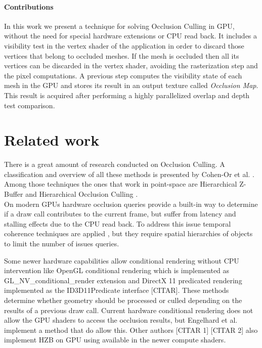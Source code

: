 \documentclass[10pt, conference]{IEEEtran}
\begin{document}
\paragraph*{Contributions}
%
In this work we present a technique for solving Occlusion Culling in GPU, without the need for special hardware extensions or CPU read back. 
It includes a visibility test in the vertex shader of the application in order to discard those vertices that belong to occluded meshes. 
If the mesh is occluded then all its vertices can be discarded in the vertex shader, avoiding the rasterization step and the pixel computations. 
A previous step computes the visibility state of each mesh in the GPU and stores its result in an output texture called \emph{Occlusion Map}. 
This result is acquired after performing a highly parallelized overlap and depth test comparison.


\section{Related work}
%
There is a great amount of research conducted on Occlusion Culling. 
A classification and overview of all these methods is presented by Cohen-Or et al. \cite{survey_visibility}. 
Among those techniques the ones that work in point-space are Hierarchical Z-Buffer \cite{Hierarchical_zbuffer} and Hierarchical Occlusion Culling \cite{hom}.\\

On modern GPUs hardware occlusion queries \cite{nv_occlusion_queries} provide a built-in way to determine if a draw call contributes to the current frame, 
but suffer from latency and stalling effects due to the CPU read back. 
To address this issue temporal coherence techniques are applied \cite{occlusion_queries_2}\cite{occlusion_queries_3}, but they require spatial hierarchies of objects to limit the number 
of issues queries.\

Some newer hardware capabilities allow conditional rendering without CPU intervention like OpenGL conditional rendering  which is implemented as 
GL\_NV\_conditional\_render \cite{nv_conditional_render} extension and DirectX 11 predicated rendering implemented as the ID3D11Predicate interface [CITAR]. 
These methods determine whether geometry should be processed or culled depending on the results of a previous draw call. 
Current hardware conditional rendering does not allow the GPU shaders to access the occlusion results, but Engelhard et al. \cite{visibility_queries} implement a method that do allow this. 
Other authors [CITAR 1] [CITAR 2] also implement HZB on GPU using available in the newer compute shaders.\
\end{document}

